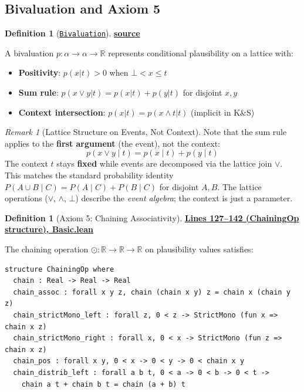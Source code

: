 \documentclass[11pt]{article}
\theoremstyle{definition}
\newtheorem{definition}[theorem]{Definition}
\theoremstyle{remark}
\newtheorem{remark}[theorem]{Remark}
\begin{document}
\subsection{Bivaluation and Axiom 5}

\begin{definition}[\href{https://github.com/zariuq/ks-foundations-of-inference/blob/main/KnuthSkilling/Probability/ConditionalProbability/Basic.lean}{\texttt{Bivaluation}}]
\textbf{\href{https://github.com/zariuq/ks-foundations-of-inference/blob/main/KnuthSkilling/Probability/ConditionalProbability/Basic.lean}{source}}

A bivaluation $p : \alpha \to \alpha \to \mathbb{R}$ represents conditional plausibility on a lattice with:
\begin{itemize}
\item \textbf{Positivity}: $p(x|t) > 0$ when $\bot < x \leq t$
\item \textbf{Sum rule}: $p(x \vee y|t) = p(x|t) + p(y|t)$ for disjoint $x, y$
\item \textbf{Context intersection}: $p(x|t) = p(x \wedge t|t)$ (implicit in K\&S)
\end{itemize}
\end{definition}

\begin{remark}[Lattice Structure on Events, Not Context]
Note that the sum rule applies to the \textbf{first argument} (the event), not the context:
\[ p(x \vee y \mid t) = p(x \mid t) + p(y \mid t) \]
The context $t$ stays \textbf{fixed} while events are decomposed via the lattice join $\vee$.
This matches the standard probability identity $P(A \cup B \mid C) = P(A \mid C) + P(B \mid C)$ for disjoint $A, B$.
The lattice operations ($\vee$, $\wedge$, $\bot$) describe the \emph{event algebra}; the context is just a parameter.
\end{remark}

\begin{definition}[Axiom 5: Chaining Associativity]
\textbf{\href{https://github.com/zariuq/ks-foundations-of-inference/blob/main/KnuthSkilling/Probability/ConditionalProbability/Basic.lean}{Lines 127--142 (ChainingOp structure), Basic.lean}}

The chaining operation $\odot : \mathbb{R} \to \mathbb{R} \to \mathbb{R}$ on plausibility values satisfies:
\end{definition}

\begin{lstlisting}[caption={\texttt{ChainingOp} structure (\href{https://github.com/zariuq/ks-foundations-of-inference/blob/main/KnuthSkilling/Probability/ConditionalProbability/Basic.lean}{Basic.lean})},numbers=none]
structure ChainingOp where
  chain : Real -> Real -> Real
  chain_assoc : forall x y z, chain (chain x y) z = chain x (chain y z)
  chain_strictMono_left : forall z, 0 < z -> StrictMono (fun x => chain x z)
  chain_strictMono_right : forall x, 0 < x -> StrictMono (fun z => chain x z)
  chain_pos : forall x y, 0 < x -> 0 < y -> 0 < chain x y
  chain_distrib_left : forall a b t, 0 < a -> 0 < b -> 0 < t ->
    chain a t + chain b t = chain (a + b) t
\end{lstlisting}
\end{document}
